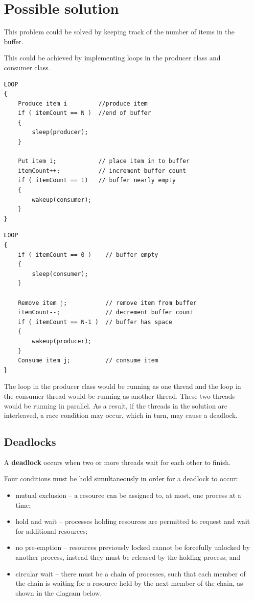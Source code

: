 \documentclass[a4paper]{systems-software}
\begin{document}
\section*{Possible solution}

This problem could be solved by keeping track of the number of items in the buffer.

This could be achieved by implementing loops in the producer class and consumer class.

\begin{lstlisting}[title={Producer class.}]
LOOP
{
	Produce item i         //produce item
	if ( itemCount == N )  //end of buffer
	{
		sleep(producer);
	}

	Put item i;            // place item in to buffer
	itemCount++;           // increment buffer count
	if ( itemCount == 1)   // buffer nearly empty
	{
		wakeup(consumer);
	}
}
\end{lstlisting}

\begin{lstlisting}[title={Consumer class.}]
LOOP
{
	if ( itemCount == 0 )    // buffer empty
	{
		sleep(consumer);
	}

	Remove item j;           // remove item from buffer
	itemCount--;             // decrement buffer count
	if ( itemCount == N-1 )  // buffer has space
	{
		wakeup(producer);
	}
	Consume item j;          // consume item
}
\end{lstlisting}

The loop in the producer class would be running as one thread and the loop in the consumer thread would be running as another thread. These two threads would be running in parallel. As a result, if the threads in the solution are interleaved, a race condition may occur, which in turn, may cause a deadlock.


\subsection*{Deadlocks}

A \textbf{deadlock} occurs when two or more threads wait for each other to finish.

Four conditions must be hold simultaneously in order for a deadlock to occur:
\begin{itemize}
	\item mutual exclusion -- a resource can be assigned to, at most, one process at a time;
	\item hold and wait -- processes holding resources are permitted to request and wait for additional resources;
	\item no pre-emption	 -- resources previously locked cannot be forcefully unlocked by another process, instead they must be released by the holding process; and
	\item circular wait -- there must be a chain of processes, such that each member of the chain is waiting for a resource held by the next member of the chain, as shown in the diagram below.
\end{itemize}
\end{document}
